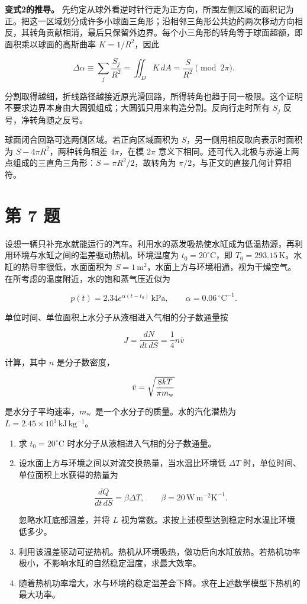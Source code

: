 \documentclass[12pt,a4paper,UTF8]{ctexart}
\begin{document}
\textbf{变式2的推导。}
先约定从球外看逆时针行走为正方向，所围左侧区域的面积记为正。把这一区域划分成许多小球面三角形；沿相邻三角形公共边的两次移动方向相反，其转角贡献相消，最后只保留外边界。每个小三角形的转角等于球面超额，即面积乘以球面的高斯曲率
\(K=1/R^2\)，因此

\[
\Delta\alpha\equiv\sum_j\frac{S_j}{R^2}
=\iint_D K\,dA=\frac{S}{R^2}\pmod{2\pi}.
\]

分割取得越细，折线路径越接近原光滑回路，所得转角也趋于同一极限。这个证明不要求边界本身由大圆弧组成；大圆弧只用来构造分割。反向行走时所有
\(S_j\) 反号，净转角随之反号。

球面闭合回路可选两侧区域。若正向区域面积为
\(S\)，另一侧用相反取向表示时面积为 \(S-4\pi R^2\)，两种转角相差
\(4\pi\)，在模 \(2\pi\)
意义下相同。还可代入北极与赤道上两点组成的三直角三角形：\(S=\pi R^2/2\)，故转角为
\(\pi/2\)，与正文的直接几何计算相符。

\newpage

\section{第 7 题}\label{ux7b2c-7-ux9898}

设想一辆只补充水就能运行的汽车。利用水的蒸发吸热使水缸成为低温热源，再利用环境与水缸之间的温差驱动热机。环境温度为
\(t_0=20^\circ\mathrm C\)，即
\(T_0=293.15\,\mathrm K\)。水缸的热导率很低，水面面积为
\(S=1\,\mathrm{m^2}\)，水面上方与环境相通，视为干燥空气。在所考虑的温度附近，水的饱和蒸气压近似为

\[
p(t)=2.34e^{\alpha(t-t_0)}\,\mathrm{kPa},
\qquad
\alpha=0.06\,{}^\circ\mathrm C^{-1}.
\]

单位时间、单位面积上水分子从液相进入气相的分子数通量按

\[
J=\frac{dN}{dt\,dS}=\frac14n\bar v
\]

计算，其中 \(n\) 是分子数密度，

\[
\bar v=\sqrt{\frac{8kT}{\pi m_{\rm w}}}
\]

是水分子平均速率，\(m_{\rm w}\) 是一个水分子的质量。水的汽化潜热为
\(L=2.45\times10^3\,\mathrm{kJ\,kg^{-1}}\)。

\begin{enumerate}
\def\labelenumi{\arabic{enumi}.}
\item
  求 \(t_0=20^\circ\mathrm C\) 时水分子从液相进入气相的分子数通量。
\item
  设水面上方与环境之间以对流交换热量，当水温比环境低 \(\Delta T\)
  时，单位时间、单位面积上水获得的热量为

  \[
  \frac{dQ}{dt\,dS}=\beta\Delta T,
  \qquad
  \beta=20\,\mathrm{W\,m^{-2}K^{-1}}.
  \]

  忽略水缸底部温差，并将 \(L\)
  视为常数。求按上述模型达到稳定时水温比环境低多少。
\item
  利用该温差驱动可逆热机。热机从环境吸热，做功后向水缸放热。若热机功率极小，不影响水缸的自然稳定温度，求最大效率。
\item
  随着热机功率增大，水与环境的稳定温差会下降。求在上述数学模型下热机的最大功率。
\end{enumerate}
\end{document}
